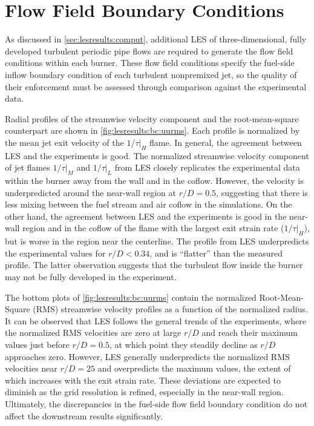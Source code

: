 \section{Flow Field Boundary Conditions}
\label{sec:lesresults:bc}

As discussed in \cref{sec:lesresults:comput}, additional LES of three-dimensional, fully developed turbulent periodic pipe flows are required to generate the flow field conditions within each burner. These flow field conditions specify the fuel-side inflow boundary condition of each turbulent nonpremixed jet, so the quality of their enforcement must be assessed through comparison against the experimental data. 

Radial profiles of the streamwise velocity component and the root-mean-square counterpart are shown in \cref{fig:lesresults:bc:uurms}. Each profile is normalized by the mean jet exit velocity of the $1/\tau|_H$ flame. In general, the agreement between LES and the experiments is good. The normalized streamwise velocity component of jet flames $1/\tau|_M$ and $1/\tau|_L$ from LES closely replicates the experimental data within the burner away from the wall and in the coflow. However, the velocity is underpredicted around the near-wall region at $r/D = 0.5$, suggesting that there is less mixing between the fuel stream and air coflow in the simulations. On the other hand, the agreement between LES and the experiments is good in the near-wall region and in the coflow of the flame with the largest exit strain rate ($1/\tau|_H$), but is worse in the region near the centerline. The profile from LES underpredicts the experimental values for $r/D < 0.34$, and is ``flatter'' than the measured profile. The latter observation suggests that the turbulent flow inside the burner may not be fully developed in the experiment.

The bottom plots of \cref{fig:lesresults:bc:uurms} contain the normalized Root-Mean-Square (RMS) streamwise velocity profiles as a function of the normalized radius. It can be observed that LES follows the general trends of the experiments, where the normalized RMS velocities are zero at large $r/D$ and reach their maximum values just before $r/D = 0.5$, at which point they steadily decline as $r/D$ approaches zero. However, LES generally underpredicts the normalized RMS velocities near $r/D = 25$ and overpredicts the maximum values, the extent of which increases with the exit strain rate. These deviations are expected to diminish as the grid resolution is refined, especially in the near-wall region. Ultimately, the discrepancies in the fuel-side flow field boundary condition do not affect the downstream results significantly.

